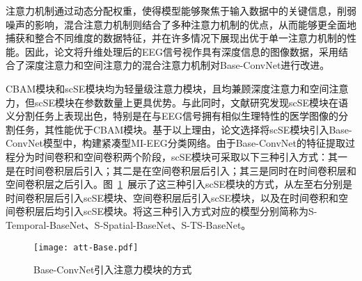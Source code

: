 注意力机制通过动态分配权重，使得模型能够聚焦于输入数据中的关键信息，削弱噪声的影响，混合注意力机制则结合了多种注意力机制的优点，从而能够更全面地捕获和整合不同维度的数据特征，并在许多情况下展现出优于单一注意力机制的性能。因此，论文将升维处理后的EEG信号视作具有深度信息的图像数据，采用结合了深度注意力和空间注意力的混合注意力机制对Base-ConvNet进行改进。

CBAM模块和scSE模块均为轻量级注意力模块，且均兼顾深度注意力和空间注意力，但scSE模块在参数数量上更具优势。与此同时，文献\cite{roy2018concurrent}研究发现scSE模块在语义分割任务上表现出色，特别是在与EEG信号拥有相似生理特性的医学图像的分割任务，其性能优于CBAM模块。基于以上理由，论文选择将scSE模块引入Base-ConvNet模型中，构建紧凑型MI-EEG分类网络。由于Base-ConvNet的特征提取过程分为时间卷积和空间卷积两个阶段，scSE模块可采取以下三种引入方式：其一是在时间卷积层后引入；其二是在空间卷积层后引入；其三是同时在时间卷积层和空间卷积层之后引入。图~\ref{fig:att-Base}~展示了这三种引入scSE模块的方式，从左至右分别是时间卷积层后引入scSE模块、空间卷积层后引入scSE模块，以及在时间卷积和空间卷积层后均引入scSE模块。将这三种引入方式对应的模型分别简称为S-Temporal-BaseNet、S-Spatial-BaseNet、S-TS-BaseNet。
\begin{figure}
  \centering
  \texttt{[image: att-Base.pdf]}
  \caption{Base-ConvNet引入注意力模块的方式}
  \label{fig:att-Base}
\end{figure}

